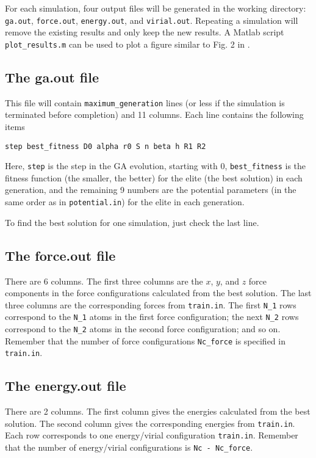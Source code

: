 \documentclass[12pt,a4paper]{report}
\begin{document}
For each simulation, four output files will be generated in the working directory: \verb"ga.out", \verb"force.out", \verb"energy.out", and \verb"virial.out". Repeating a simulation will remove the existing results and only keep the new results. A Matlab script \verb"plot_results.m" can be used to plot a figure similar to Fig. 2 in \cite{fan2019arxiv}.

\subsection{The ga.out file}

This file will contain \verb"maximum_generation" lines (or less if the simulation is terminated before completion) and 11 columns. Each line contains the following items
\begin{verbatim}
step best_fitness D0 alpha r0 S n beta h R1 R2
\end{verbatim}
Here, \verb"step" is the step in the GA evolution, starting with 0, \verb"best_fitness" is the fitness function (the smaller, the better) for the elite (the best solution) in each generation, and the remaining 9 numbers are the potential parameters (in the same order as in \verb"potential.in") for the elite in each generation.

To find the best solution for one simulation, just check the last line.

\subsection{The force.out file}

There are 6 columns. The first three columns are the $x$, $y$, and $z$ force components in the force configurations calculated from the best solution. The last three columns are the corresponding forces from \verb"train.in". The first \verb"N_1" rows correspond to the \verb"N_1" atoms in the first force configuration; the next \verb"N_2" rows correspond to the \verb"N_2" atoms in the second force configuration; and so on. Remember that the number of force configurations \verb"Nc_force" is specified in \verb"train.in".

\subsection{The energy.out file}

There are 2 columns. The first column gives the energies calculated from the best solution. The second column gives the corresponding energies from \verb"train.in". Each row corresponds to one energy/virial configuration \verb"train.in". Remember that the number of energy/virial configurations is \verb"Nc - Nc_force".
\end{document}
